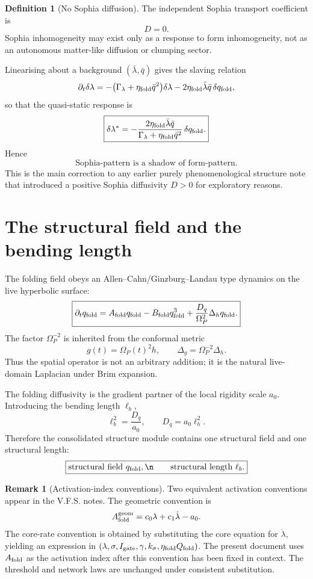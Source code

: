 \documentclass[11pt]{article}
\newcommand{\Op}{\Omega_P}
\newcommand{\qf}{q_{\rm fold}}
\newcommand{\Qf}{Q_{\rm fold}}
\newcommand{\Igate}{I_{\rm gate}}
\newcommand{\Af}{A_{\rm fold}}
\newcommand{\Bf}{B_{\rm fold}}
\newcommand{\Dq}{D_q}
\newcommand{\etaf}{\eta_{\rm fold}}
\newcommand{\laph}{\Delta_h}
\theoremstyle{definition}
\newtheorem{definition}{Definition}[section]
\newtheorem{remark}{Remark}[section]
\theoremstyle{plain}
\begin{document}
\begin{definition}[No Sophia diffusion]
The independent Sophia transport coefficient is
\[
\boxed{D=0.}
\]
Sophia inhomogeneity may exist only as a response to form inhomogeneity, not as an autonomous
matter-like diffusion or clumping sector.
\end{definition}

Linearising about a background $(\bar\lambda,\bar q)$ gives the slaving relation
\[
\partial_t\delta\lambda
=-\bigl(\Gamma_\lambda+\etaf\bar q^2\bigr)\delta\lambda
-2\etaf\bar\lambda\bar q\,\delta\qf,
\]
so that the quasi-static response is
\[
\boxed{
\delta\lambda^\ast
=
-\frac{2\etaf\bar\lambda\bar q}
{\Gamma_\lambda+\etaf\bar q^2}\,\delta\qf.
}
\]
Hence
\[
\boxed{\text{Sophia-pattern is a shadow of form-pattern.}}
\]
This is the main correction to any earlier purely phenomenological structure note that introduced a positive
Sophia diffusivity $D>0$ for exploratory reasons.

\section{The structural field and the bending length}

The folding field obeys an Allen--Cahn/Ginzburg--Landau type dynamics on the live hyperbolic surface:
\[
\boxed{
\partial_t\qf
=\Af\qf-\Bf\qf^3+\frac{\Dq}{\Op^2}\laph\qf.
}
\]
The factor $\Op^{-2}$ is inherited from the conformal metric
\[
 g(t)=\Op(t)^2h,
\qquad
\Delta_g=\Op^{-2}\Delta_h.
\]
Thus the spatial operator is not an arbitrary addition; it is the natural live-domain Laplacian under
Brim expansion.

The folding diffusivity is the gradient partner of the local rigidity scale $a_0$.  Introducing the bending
length $\ell_b$,
\[
\boxed{
\ell_b^2=\frac{\Dq}{a_0},
\qquad
\Dq=a_0\ell_b^2.
}
\]
Therefore the consolidated structure module contains one structural field and one structural length:
\[
\boxed{\text{structural field }\qf,\n\qquad
\text{structural length }\ell_b.}
\]

\begin{remark}[Activation-index conventions]
Two equivalent activation conventions appear in the V.F.S. notes.  The geometric convention is
\[
\Af^{\rm geom}=c_0\lambda+c_1\dot\lambda-a_0.
\]
The core-rate convention is obtained by substituting the core equation for $\dot\lambda$, yielding an
expression in $(\lambda,\sigma,\Igate,\gamma,k_\sigma,\etaf\Qf)$.  The present document uses $\Af$ as the
activation index after this convention has been fixed in context.  The threshold and network laws are
unchanged under consistent substitution.
\end{remark}
\end{document}
